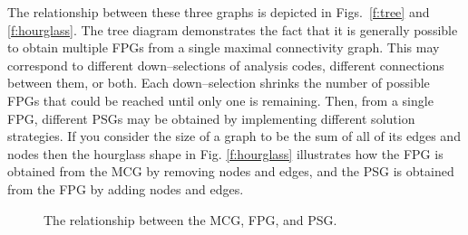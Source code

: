   The relationship between these three graphs is depicted in Figs.~\ref{f:tree} and \ref{f:hourglass}. 
  The tree diagram demonstrates the fact that it is generally possible to obtain 
  multiple FPGs from a single maximal connectivity graph. This  may correspond to 
  different down--selections of analysis codes, different connections between them, 
  or both. Each down--selection shrinks the number of possible FPGs that could be reached 
  until only one is remaining. Then, from a single FPG, different PSGs may be obtained by implementing 
  different solution strategies. If you consider the size of a graph to be the sum of all of its
  edges and nodes then the hourglass shape in Fig. \ref{f:hourglass} illustrates how
the FPG is obtained from the MCG by removing nodes and edges, 
  and the PSG is obtained from the FPG by adding nodes and edges.

  \begin{figure}[htb!]
    \centering
  \caption{The relationship between the MCG, FPG, and PSG.}
  \end{figure}

